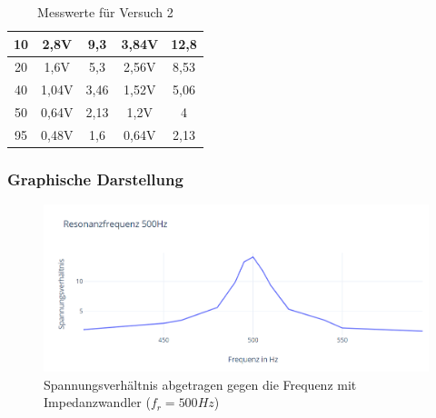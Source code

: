 \documentclass{article}
\begin{document}
\begin{table}[h]
\begin{center}
\begin{tabular}{|c|c|c|c|c|}
      \hline
      10         & 2,8V                                              & 9,3                                            & 3,84V       & 12,8                              \\
      \hline
      20         & 1,6V                                              & 5,3                                            & 2,56V       & 8,53                              \\
      \hline
      40         & 1,04V                                             & 3,46                                           & 1,52V       & 5,06                              \\
      \hline
      50         & 0,64V                                             & 2,13                                           & 1,2V        & 4                                 \\
      \hline
      95         & 0,48V                                             & 1,6                                            & 0,64V       & 2,13                              \\
      \hline
    \end{tabular}
    \caption{Messwerte für Versuch 2}
    \label{tab:MV2}
  \end{center}
\end{table}

\subsubsection{Graphische Darstellung}
\begin{figure}[h]
  \begin{center}
    \includegraphics[scale=0.75]{../assets/images/ETP3/Fre500Plot3.PNG}
    \caption{Spannungsverhältnis abgetragen gegen die Frequenz mit Impedanzwandler ($f_r = 500Hz$)}
  \end{center}
\end{figure}
\end{document}
